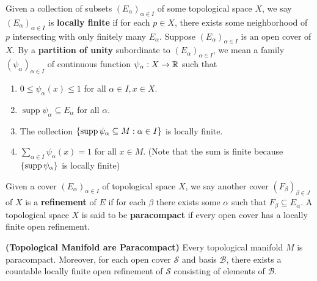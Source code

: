 \documentclass{report}
\begin{document}
\begin{mdframed}
Given a collection of subsets $(E_\alpha )_{\alpha \in I}$ of some topological space $X$, we say $(E_\alpha )_{\alpha  \in I}$ is \textbf{locally finite} if for each $p \in X$, there exists some neighborhood of $p$ intersecting with only finitely many $E_\alpha$. Suppose $(E_\alpha )_{\alpha \in I}$ is an open cover of $X$. By a  \textbf{partition of unity} subordinate to $(E_\alpha )_{\alpha \in I}$, we mean a family $(\psi_\alpha )_{\alpha \in I}$ of continuous function  $\psi_\alpha :X\rightarrow \mathbb{R}$ such that  
\begin{enumerate}[label=(\roman*)]
  \item $0\leq \psi_\alpha  (x)\leq 1$ for all $\alpha \in I,x\in X$. 
  \item $\operatorname{supp}\psi_\alpha  \subseteq E_\alpha $ for all $\alpha $. 
  \item The collection $\{ \operatorname{supp}\psi_\alpha \subseteq M:\alpha \in I \}$ is locally finite.
  \item  $\sum_{\alpha \in I}\psi_\alpha (x)=1$ for all $x\in M$. (Note that the sum is finite because $\{ \operatorname{supp}\psi_\alpha \}$ is locally finite)
\end{enumerate}
Given a cover $(E_\alpha )_{\alpha \in I}$ of topological space $X$, we say another cover $(F_\beta  )_{\beta  \in J}$ of $X$ is a  \textbf{refinement}  of $E$ if for each $\beta $ there exists some $\alpha $ such that $F_\beta  \subseteq E_\alpha $. A topological space $X$ is said to be \textbf{paracompact} if every open cover has a locally finite open refinement. 
\end{mdframed}
\begin{theorem}
\label{Topological Manifold are Paracompact}
\textbf{(Topological Manifold are Paracompact)} Every topological manifold $M$ is paracompact. Moreover, for each open cover $\mathcal{S}$ and basis $\mathcal{B}$, there exists a countable locally finite open refinement of $\mathcal{S}$ consisting of elements of $\mathcal{B}$.  
\end{theorem}
\end{document}
